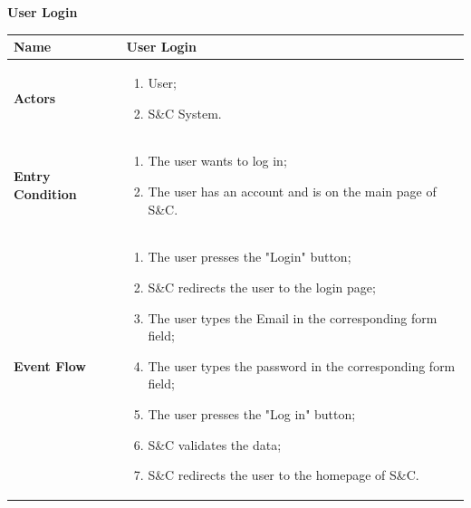         \begin{enumerate}[label=\textbf{[US\arabic*]}, left = 0pt, align = left]
            \item \textbf{User Login}
            
            \begin{longtable}{|l|p{11cm}|}  
                \hline
                \textbf{Name} & 
                    \textbf{User Login} \\
                \hline
                
                \textbf{Actors} & 
                    \begin{enumerate}[label=\textbullet, itemsep=0em]
                        \item User;
                        \item S\&C System.
                    \end{enumerate} \\
                \hline
                
                \textbf{Entry Condition} & 
                    \begin{enumerate}[label=\textbullet, itemsep=0em]
                        \item The user wants to log in;
                        \item The user has an account and is on the main page of S\&C.
                    \end{enumerate} \\
                \hline
                
                \textbf{Event Flow} &
                    \begin{enumerate}[label=\arabic*., itemsep=0.2em]
                        \item The user presses the "Login" button;
                        \item S\&C redirects the user to the login page;
                        \item The user types the Email in the corresponding form field;
                        \item The user types the password in the corresponding form field;
                        \item The user presses the "Log in" button;
                        \item S\&C validates the data;
                        \item S\&C redirects the user to the homepage of S\&C.
                    \end{enumerate} \\
                \hline
                

\end{longtable}
\end{enumerate}
